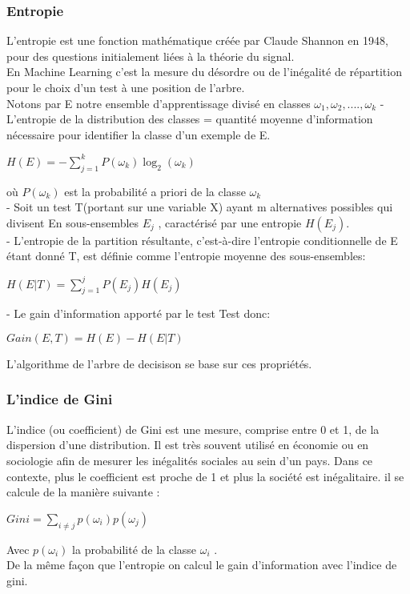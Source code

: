 \subsubsection{Entropie}
L’entropie  est une fonction mathématique créée par Claude Shannon en 1948, pour des questions initialement liées à la théorie du signal.\\
En Machine Learning c'est la mesure du désordre ou de l'inégalité de répartition pour le choix d'un test à une position  de l'arbre.\\
Notons par E notre ensemble d'apprentissage divisé en classes ${\omega}_{1},{\omega}_{2},....,{\omega}_{k}$
- L'entropie de la distribution des classes = quantité moyenne d'information nécessaire pour identifier la classe d'un exemple de E.\\
 \begin{center}$ H(E)=-\sum _{j=1}^{k} P({\omega}_{k} ) \log_{2}({\omega}_{k})$\end{center}
 
où $ P({\omega}_{k} )$ est la probabilité a priori de la classe $ {\omega}_{k}$ \\
- Soit un test T(portant sur une variable X) ayant m alternatives possibles qui divisent En sous-ensembles $ {E}_{j}$ , caractérisé par une entropie $ H({E}_{j})$.\\
- L'entropie de la partition résultante, c'est-à-dire l'entropie conditionnelle de E étant donné T, est définie comme l'entropie moyenne des sous-ensembles:
\begin{center}$ H(E|T)=\sum _{j=1}^{j} P({E}_{j})H({E}_{j})$\end{center}
- Le gain d'information apporté par le test Test donc:
\begin{center}$ Gain(E,T)=H(E) - H(E|T)$\end{center}
L'algorithme de l'arbre de decisison se base sur ces propriétés.
\subsubsection{L'indice de Gini}
L’indice (ou coefficient) de Gini est une mesure, comprise entre 0 et 1, de la dispersion d’une distribution. Il est très souvent utilisé en économie ou en sociologie afin de mesurer les inégalités sociales au sein d’un pays. Dans ce contexte, plus le coefficient est proche de 1 et plus la société est inégalitaire.
il se calcule de la manière suivante :
\begin{center}
	$ Gini = \sum_{i\ne j} p({\omega}_{i})p({\omega}_{j})$
\end{center}
Avec $p({\omega}_{i})$ la probabilité de la classe $ {\omega}_{i} $ .\\
De la même façon que l'entropie on calcul le gain d'information avec l'indice de gini.
